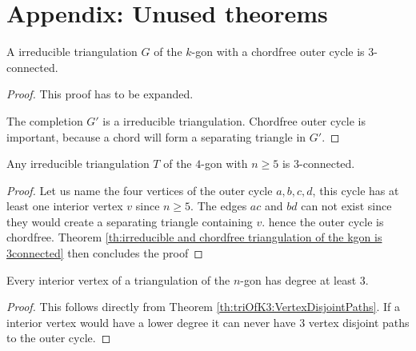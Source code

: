
\section{Appendix: Unused theorems}


\begin{thrm}
\label{th:irreducible and chordfree triangulation of the kgon is 3connected}
A irreducible triangulation $G$ of the $k$-gon with a chordfree outer cycle is $3$-connected.
\end{thrm}
\begin{proof}
  This proof has to be expanded.

  The completion $G'$ is a irreducible triangulation. Chordfree outer cycle is important, because a chord will form a separating triangle in $G'$.
\end{proof}

\begin{thrm}
  Any irreducible triangulation $T$ of the $4$-gon with $n \geq 5$ is $3$-connected.
\end{thrm}
\begin{proof}
  Let us name the four vertices of the outer cycle $a,b,c,d$, this cycle has at least one interior vertex $v$ since $n\geq 5$. The edges $ac$ and $bd$ can not exist since they would create a separating triangle containing $v$. hence the outer cycle is chordfree.
  Theorem \ref{th:irreducible and chordfree triangulation of the kgon is 3connected} then concludes the proof
\end{proof}


\begin{thrm}
  Every interior vertex of a triangulation of the $n$-gon has degree at least $3$.
\end{thrm}

\begin{proof}
  This follows directly from Theorem \ref{th:triOfK3:VertexDisjointPaths}. If a interior vertex would have a lower degree it can never have $3$ vertex disjoint paths to the outer cycle.
\end{proof}


